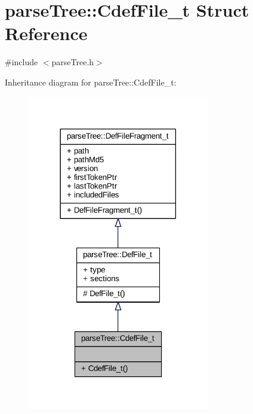 \hypertarget{structparse_tree_1_1_cdef_file__t}{}\section{parse\+Tree\+:\+:Cdef\+File\+\_\+t Struct Reference}
\label{structparse_tree_1_1_cdef_file__t}


{\ttfamily \#include $<$parse\+Tree.\+h$>$}



Inheritance diagram for parse\+Tree\+:\+:Cdef\+File\+\_\+t\+:
\nopagebreak
\begin{figure}[H]
\begin{center}
\leavevmode
\includegraphics[width=225pt]{structparse_tree_1_1_cdef_file__t__inherit__graph}
\end{center}
\end{figure}


